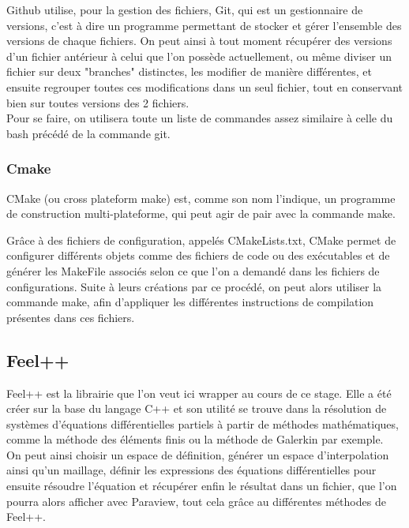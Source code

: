 \documentclass[french,12pt]{article}
\begin{document}
Github utilise, pour la gestion des fichiers, Git, qui est un gestionnaire de versions, c'est à dire un programme permettant de stocker et gérer l'ensemble des versions de chaque fichiers. On peut ainsi à tout moment récupérer des versions d'un fichier antérieur à celui que l'on possède actuellement, ou même diviser un fichier sur deux "branches" distinctes, les modifier de manière différentes, et ensuite regrouper toutes ces modifications dans un seul fichier, tout en conservant bien sur toutes versions des 2 fichiers.\\

Pour se faire, on utilisera toute un liste de commandes assez similaire à celle du bash précédé de la commande git.

\subsubsection{Cmake}

CMake (ou cross plateform make) est, comme son nom l'indique, un programme de construction multi-plateforme, qui peut agir de pair avec la commande make. 
\newline

Grâce à des fichiers de configuration, appelés CMakeLists.txt, CMake permet de configurer différents objets comme des fichiers de code ou des exécutables et de générer les MakeFile associés selon ce que l'on a demandé dans les fichiers de configurations. Suite à leurs créations par ce procédé, on peut alors utiliser la commande make, afin d'appliquer les différentes instructions de compilation présentes dans ces fichiers.

\subsection{Feel++}

Feel++ est la librairie que l'on veut ici wrapper au cours de ce stage. Elle a été créer sur la base du langage C++ et son utilité se trouve dans la résolution de systèmes d'équations différentielles partiels à partir de méthodes mathématiques, comme la méthode des éléments finis ou la méthode de Galerkin par exemple.\\

On peut ainsi choisir un espace de définition, générer un espace d'interpolation ainsi qu'un maillage, définir les expressions des équations différentielles pour ensuite résoudre l'équation et récupérer enfin le résultat dans un fichier, que l'on pourra alors afficher avec Paraview, tout cela grâce au différentes méthodes de Feel++.
\end{document}
